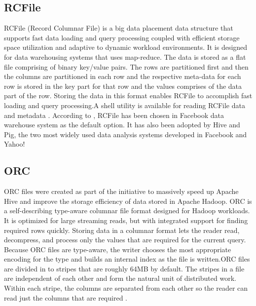 \subsection{ RCFile}

     RCFile (Record Columnar File) \cite{www-rcfile-wiki} is a big
     data placement data structure that supports fast data loading and
     query processing coupled with efficient storage space utilization
     and adaptive to dynamic workload environments. It is designed for
     data warehousing systems that uses map-reduce. The data is stored
     as a flat file comprising of binary key/value pairs. The rows are
     partitioned first and then the columns are partitioned in each
     row and the respective meta-data for each row is stored in the
     key part for that row and the values comprises of the data part
     of the row. Storing the data in this format enables RCFile to
     accomplish fast loading and query processing.A shell utility is
     available for reading RCFile data and metadata
     \cite{www-rcfile-cat}. According to \cite{he2011rcfile}, RCFile has
     been chosen in Facebook data warehouse system as the default
     option. It has also been adopted by Hive and Pig, the two most
     widely used data analysis systems developed in Facebook and
     Yahoo!

\subsection{ ORC}

     ORC files were created as part of the initiative to massively
     speed up Apache Hive and improve the storage efficiency of data
     stored in Apache Hadoop. ORC is a self-describing type-aware
     columnar file format designed for Hadoop workloads. It is
     optimized for large streaming reads, but with integrated support
     for finding required rows quickly. Storing data in a columnar
     format lets the reader read, decompress, and process only the
     values that are required for the current query. Because ORC files
     are type-aware, the writer chooses the most appropriate encoding
     for the type and builds an internal index as the file is
     written.ORC files are divided in to stripes that are roughly 64MB
     by default. The stripes in a file are independent of each other
     and form the natural unit of distributed work. Within each
     stripe, the columns are separated from each other so the reader
     can read just the columns that are required \cite{www-orc-docs}.

